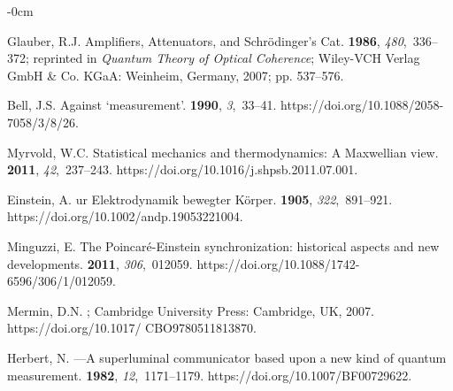 \documentclass[entropy,article,accept,oneauthor,pdftex]{Definitions/mdpi}
\begin{document}
\begin{adjustwidth}{-\extralength}{0cm}
\begin{thebibliography}{999}
Glauber, R.J.
\newblock Amplifiers, Attenuators, and {S}chr\"odinger's Cat.
 {\bf 1986}, {\em
  480},~336--372;    reprinted in {\em Quantum Theory of Optical Coherence}; Wiley-VCH Verlag GmbH
  \& Co. KGaA: Weinheim, Germany,  2007; pp. 537--576.













Bell, J.S.
\newblock Against `measurement'.
 {\bf 1990}, {\em 3},~33--41.
\newblock
  {https://doi.org/10.1088/2058-7058/3/8/26}.

Myrvold, W.C.
\newblock Statistical mechanics and thermodynamics: A {M}axwellian view.
 {\bf 2011}, {\em 42},~237--243.
\newblock
  {https://doi.org/10.1016/j.shpsb.2011.07.001}.

Einstein, A.
ur {E}lektrodynamik bewegter {K}{\"{o}}rper.
 {\bf 1905}, {\em 322},~891--921.
\newblock
  {https://doi.org/10.1002/andp.19053221004}.

Minguzzi, E.
\newblock The Poincar{\'{e}}-Einstein synchronization: historical aspects and
  new developments.
 {\bf 2011}, {\em
  306},~012059.
\newblock
  {https://doi.org/10.1088/1742-6596/306/1/012059}.

Mermin, D.N.
; Cambridge University Press:
  Cambridge, UK, 2007.
\newblock
  {https://doi.org/10.1017/ CBO9780511813870}.

Herbert, N.
---{A} superluminal communicator based upon a new kind of
  quantum measurement.
 {\bf 1982}, {\em 12},~1171--1179.
\newblock
  {https://doi.org/10.1007/BF00729622}.


\end{thebibliography}
\end{adjustwidth}
\end{document}
